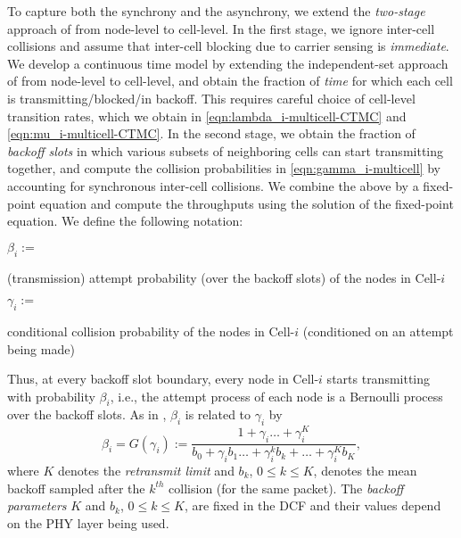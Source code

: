 \documentclass[10pt,a4paper,journal]{IEEEtran}
\theoremstyle{definition}
\theoremstyle{remark}
\theoremstyle{plain}
\begin{document}
To capture both the synchrony and the asynchrony, we extend the \textit{two-stage} approach of \cite{wanet.garetto_etal08starvation} from node-level to cell-level. In the first stage, we ignore inter-cell collisions and assume that inter-cell blocking due to carrier sensing is \textit{immediate}. We develop a continuous time model by extending the independent-set approach of \cite{wanet.boorstyn87multihop} from node-level to cell-level, and obtain the fraction of \textit{time} for which each cell is transmitting/blocked/in backoff. This requires careful choice of cell-level transition rates, which we obtain in \eqref{eqn:lambda_i-multicell-CTMC} and \eqref{eqn:mu_i-multicell-CTMC}. In the second stage, we obtain the fraction of \textit{backoff slots} in which various subsets of neighboring cells can start transmitting together, and compute the collision probabilities in \eqref{eqn:gamma_i-multicell} by accounting for synchronous inter-cell collisions. We combine the above by a fixed-point equation and compute the throughputs using the solution of the fixed-point equation. We define the following notation: 



\vspace{1mm}

\noindent $\beta_i :=$ \parbox[t] {7.5cm} {(transmission) attempt probability (over the backoff slots) of the nodes in Cell-$i$}

\vspace{1mm}

\noindent $\gamma_i :=$ \parbox[t] {7.6cm} {conditional collision probability of the nodes in Cell-$i$ (conditioned on an attempt being made)}

\vspace{1mm}


Thus, at every backoff slot boundary, every node in Cell-$i$ starts transmitting with probability $\beta_i$, i.e., the attempt process of each node is a Bernoulli process over the backoff slots. As in \cite{wanet.kumar_etal07new_insights}, $\beta_i$ is related to $\gamma_i$ by \begin{equation} 
\label{eqn:G_gamma_i}
\beta_i = G(\gamma_i) := \frac{1 + \gamma_i \dots + \gamma_i^K}{b_0 + \gamma_i b_1 \dots + \gamma_i^k b_k + \dots + \gamma_i^K b_K}, 
\end{equation} 
where $K$ denotes the \textit{retransmit limit} and $b_k$, $0 \leq k \leq K$, denotes the mean backoff sampled after the $k^{th}$ collision (for the same packet). The \textit{backoff parameters} $K$ and $b_k$, $0 \leq k \leq K$, are fixed in the DCF and their values depend on the PHY layer being used. 
\end{document}
